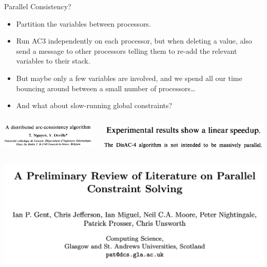 \documentclass[aspectratio=169,compress,10pt]{beamer}
\begin{document}
\begin{frame}{Parallel Consistency?}

     {
        \begin{itemize}
            \item Partition the variables between processors.
            \item Run AC3 independently on each processor, but when deleting a value, also send a
                message to other processors telling them to re-add the relevant variables to their
                stack.
            \item But maybe only a few variables are involved, and we spend all our time
                bouncing around between a small number of processors\ldots
            \item And what about slow-running global constraints?
        \end{itemize}
    }

     {
        \begin{columns}[T]
            \centering\includegraphics[keepaspectratio=true,scale=0.12]{disac4-paper.png}

            \centering\includegraphics[keepaspectratio=true,scale=0.12]{disac4-linear.png}
            \vspace{0.5em}
            \centering\includegraphics[keepaspectratio=true,scale=0.12]{disac4-massive.png}
        \end{columns}

        \vspace{3em}

        \begin{columns}[T]
            \centering\includegraphics[keepaspectratio=true,scale=0.12]{parallel-consistency-paper.png}


\end{columns}}
\end{frame}
\end{document}
